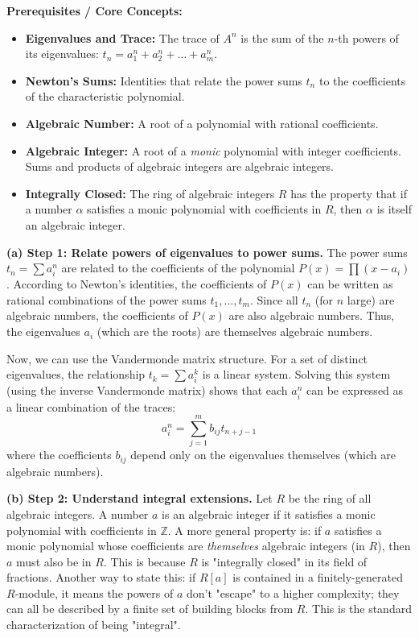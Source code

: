 \begin{solution}
\textbf{Prerequisites / Core Concepts:}
\begin{itemize}
    \item \textbf{Eigenvalues and Trace:} The trace of $A^n$ is the sum of the $n$-th powers of its eigenvalues: $t_n = a_1^n + a_2^n + \dots + a_m^n$.
    \item \textbf{Newton's Sums:} Identities that relate the power sums $t_n$ to the coefficients of the characteristic polynomial.
    \item \textbf{Algebraic Number:} A root of a polynomial with rational coefficients.
    \item \textbf{Algebraic Integer:} A root of a \textit{monic} polynomial with integer coefficients. Sums and products of algebraic integers are algebraic integers.
    \item \textbf{Integrally Closed:} The ring of algebraic integers $R$ has the property that if a number $\alpha$ satisfies a monic polynomial with coefficients in $R$, then $\alpha$ is itself an algebraic integer.
\end{itemize}

\textbf{(a) Step 1: Relate powers of eigenvalues to power sums.}
The power sums $t_n = \sum a_i^n$ are related to the coefficients of the polynomial $P(x) = \prod (x - a_i)$.
According to Newton's identities, the coefficients of $P(x)$ can be written as rational combinations of the power sums $t_1, \dots, t_m$.
Since all $t_n$ (for $n$ large) are algebraic numbers, the coefficients of $P(x)$ are also algebraic numbers. Thus, the eigenvalues $a_i$ (which are the roots) are themselves algebraic numbers.

Now, we can use the Vandermonde matrix structure. For a set of distinct eigenvalues, the relationship $t_k = \sum a_i^k$ is a linear system. Solving this system (using the inverse Vandermonde matrix) shows that each $a_i^n$ can be expressed as a linear combination of the traces:
\[ a_i^n = \sum_{j=1}^m b_{ij} t_{n+j-1} \]
where the coefficients $b_{ij}$ depend only on the eigenvalues themselves (which are algebraic numbers).

\textbf{(b) Step 2: Understand integral extensions.}
Let $R$ be the ring of all algebraic integers. A number $a$ is an algebraic integer if it satisfies a monic polynomial with coefficients in $\mathbb{Z}$.
A more general property is: if $a$ satisfies a monic polynomial whose coefficients are \textit{themselves} algebraic integers (in $R$), then $a$ must also be in $R$. This is because $R$ is "integrally closed" in its field of fractions.
Another way to state this: if $R[a]$ is contained in a finitely-generated $R$-module, it means the powers of $a$ don't "escape" to a higher complexity; they can all be described by a finite set of building blocks from $R$. This is the standard characterization of being "integral".


\end{solution}
